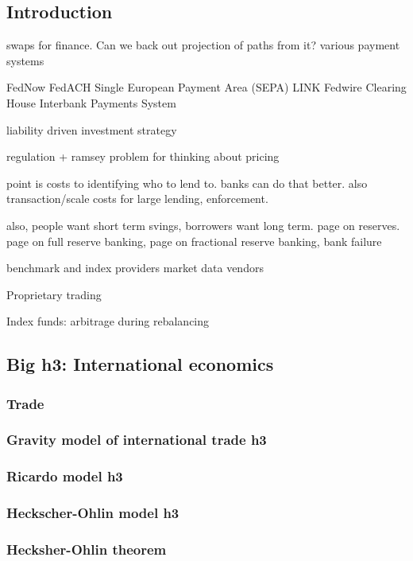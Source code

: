 
\subsection{Introduction}

swaps for finance. Can we back out projection of paths from it?
various payment systems

FedNow
FedACH
Single European Payment Area (SEPA)
LINK
Fedwire
Clearing House Interbank Payments System


liability driven investment strategy


regulation
+ ramsey problem for thinking about pricing

point is costs to identifying who to lend to. banks can do that better. also transaction/scale costs for large lending, enforcement.

also, people want short term svings, borrowers want long term. page on reserves. page on full reserve banking, page on fractional reserve banking, bank failure

benchmark and index providers
market data vendors

Proprietary trading

Index funds: arbitrage during rebalancing
\subsection{Big h3: International economics}
\subsubsection{Trade}
\subsubsection{Gravity model of international trade h3}

\subsubsection{Ricardo model h3}

\subsubsection{Heckscher-Ohlin model h3}

\subsubsection{Hecksher-Ohlin theorem}

